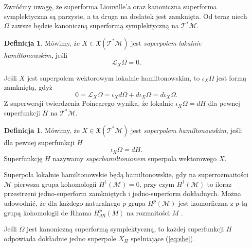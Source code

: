 \documentclass[11pt,a4paper]{report}
\theoremstyle{definition}
\newtheorem{definition}[theorem]{Definicja}
\begin{document}
Zwróćmy uwagę, że superforma Liouville'a oraz kanoniczna superforma symplektyczna są parzyste, a ta druga na dodatek jest zamknięta. Od teraz niech $\Omega$ zawsze będzie kanoniczną superformą symplektyczną na $\mathcal{T^*M}$.

\begin{definition}
 Mówimy, że $X \in \mathfrak{X}(\mathcal{T^*M})$ jest \textit{superpolem lokalnie hamiltonowskim}, jeśli
 \begin{equation*}
  \mathcal{L}_X \Omega = 0.
 \end{equation*}
\end{definition}
Jeśli $X$ jest superpolem wektorowym lokalnie hamiltonowskim, to $\iota_X \Omega$ jest formą zamkniętą, gdyż
\begin{equation*}
 0 = \mathcal{L}_X \Omega = \iota_X d \Omega + d \iota_X \Omega = d \iota_X \Omega.
\end{equation*}
Z superwersji twierdzenia Poincarego \cite{bartocci} wynika, że lokalnie $\iota_X \Omega = dH$ dla pewnej superfunkcji $H$ na $\mathcal{T^*M}$.

\begin{definition}
  Mówimy, że $X \in \mathfrak{X}(\mathcal{T^*M})$ jest \textit{superpolem hamiltonowskim}, jeśli dla pewnej superfunkcji $H$
 \begin{equation}
 \label{eq:she}
  \iota_X \Omega = dH.
 \end{equation}
 Superfunkcję $H$ nazywamy \textit{superhamiltonianem} superpola wektorowego $X$.
\end{definition}

Superpola lokalnie hamiltonowskie będą hamiltonowskie, gdy na superrozmaitości $\mathcal{M}$ pierwsza grupa kohomologii $H^1(\mathcal{M}) = 0$, przy czym $H^1(\mathcal{M})$ to iloraz przestrzeni jedno-superform zamkniętych i jedno-superform dokładnych. Można udowodnić, że dla każdego naturalnego $p$ grupa $H^p(\mathcal{M})$ jest izomorficzna z $p$-tą grupą kohomologii de Rhama $H^p _{dR} (M)$ na rozmaitości $M$ \cite{bartocci,Ko77}.

Jeśli $\Omega$ jest kanoniczną superformą symplektyczną, to każdej superfunkcji $H$ odpowiada dokładnie jedno superpole $X_H$ spełniające (\ref{eq:she}).
\end{document}
